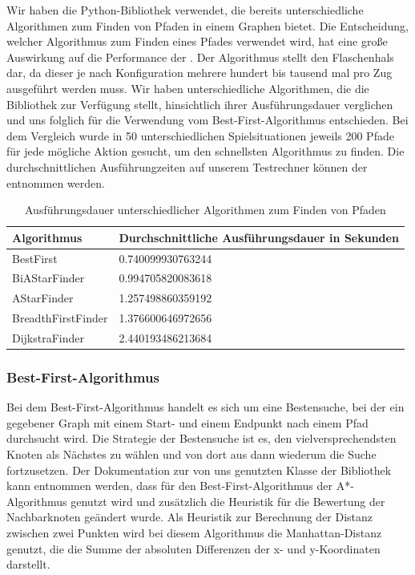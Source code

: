 Wir haben die Python-Bibliothek  verwendet, die bereits unterschiedliche Algorithmen zum Finden von
Pfaden in einem Graphen bietet.
Die Entscheidung, welcher Algorithmus zum Finden eines Pfades verwendet wird, hat eine große Auswirkung auf die
Performance der .
Der Algorithmus stellt den Flaschenhals dar, da dieser je nach Konfiguration mehrere hundert bis tausend mal pro
Zug ausgeführt werden muss.
Wir haben unterschiedliche Algorithmen, die die Bibliothek zur Verfügung stellt, hinsichtlich ihrer Ausführungsdauer verglichen und uns folglich für die
Verwendung vom Best-First-Algorithmus entschieden. 
Bei dem Vergleich wurde in 50 unterschiedlichen Spielsituationen jeweils 200 Pfade für jede mögliche Aktion gesucht, um
den schnellsten Algorithmus zu finden.
Die durchschnittlichen Ausführungzeiten auf unserem Testrechner können der
 entnommen werden.

\begin{table}[htb]
    \centering
    \begin{tabular}{|l|l|}
        \hline
            \textbf{Algorithmus} & {\textbf{Durchschnittliche Ausführungsdauer in Sekunden}} \\ \hline
            BestFirst 		    & 0.740099930763244 \\ \hline
            BiAStarFinder 		& 0.994705820083618 \\ \hline
            AStarFinder 		& 1.257498860359192 \\ \hline
            BreadthFirstFinder  & 1.376600646972656 \\ \hline
            DijkstraFinder		& 2.440193486213684 \\ \hline
    \end{tabular}
    \caption{Ausführungsdauer unterschiedlicher Algorithmen zum Finden von Pfaden}
    \label{tab:ausfuehrungsdauer-pfadalgorithmen}
\end{table}

\subsubsection*{Best-First-Algorithmus}
\label{subsubsec:best-first-algorithm}

Bei dem Best-First-Algorithmus handelt es sich um eine Bestensuche, bei der ein gegebener Graph mit einem Start- und
einem Endpunkt nach einem Pfad durchsucht wird.
Die Strategie der Bestensuche ist es, den vielversprechendsten Knoten als Nächstes zu wählen und von dort aus dann
wiederum die Suche fortzusetzen.
Der Dokumentation zur von uns genutzten Klasse  der Bibliothek  kann entnommen werden,
dass für den Best-First-Algorithmus der A*-Algorithmus genutzt wird und zusätzlich die Heuristik für die Bewertung der
Nachbarknoten geändert wurde.
Als Heuristik zur Berechnung der Distanz zwischen zwei Punkten wird bei diesem Algorithmus die Manhattan-Distanz
genutzt, die die Summe der absoluten Differenzen der x- und y-Koordinaten darstellt. 

